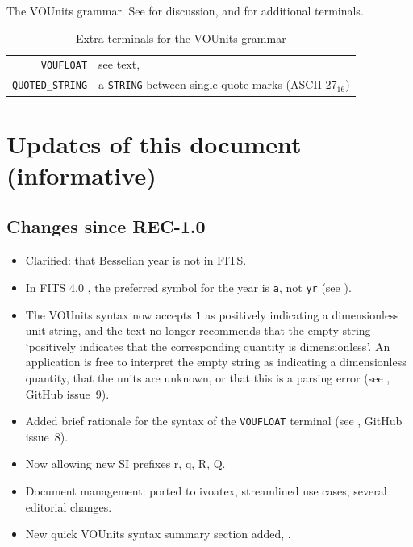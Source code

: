 \documentclass[11pt,a4paper]{ivoa}
\newcommand{\unit}[1]{\texttt{\small\color{orange}#1}}
\newcommand*\hex[1]{\uppercase{#1}${}_{16}$}
\begin{document}
\begin{table}[ht]

\caption[The VOUnits grammar]{\label{tabx:vougrammar}The VOUnits
grammar.  See  for discussion,
and  for additional terminals.}
\end{table}
\begin{table}[ht]
\begin{tabular}{rL{9cm}}
\texttt{VOUFLOAT}&see text, \\
\texttt{QUOTED\_STRING}&a \texttt{STRING} between single quote marks
    (ASCII \hex{27})
\end{tabular}
\caption[Extra VOUnits terminals]{\label{tabx:vounitsterminals}Extra terminals
for the VOUnits grammar}
\end{table}
\clearpage

\section{Updates of this document (informative)}

\subsection{Changes since REC-1.0}

\begin{itemize}
  \item Clarified: that Besselian year is not in FITS.
  \item In FITS 4.0 \citep{fits4}, the preferred symbol for the year is
    \unit{a}, not \unit{yr} (see ).
  \item The VOUnits syntax now accepts \unit{1} as positively
    indicating a dimensionless unit string, and the text no longer
    recommends that the empty string `positively indicates that the
    corresponding quantity is dimensionless'.  An application is free
    to interpret the empty string as indicating a dimensionless
    quantity, that the units are unknown, or that this is a parsing
    error (see , GitHub issue~9).
  \item Added brief rationale for the syntax of the \texttt{VOUFLOAT}
    terminal (see , GitHub issue~8).
  \item Now allowing new SI prefixes r, q, R, Q.
  \item Document management: ported to ivoatex, streamlined use cases,
    several editorial changes.
  \item New quick VOUnits syntax summary section added,
    .
\end{itemize}
\end{document}
